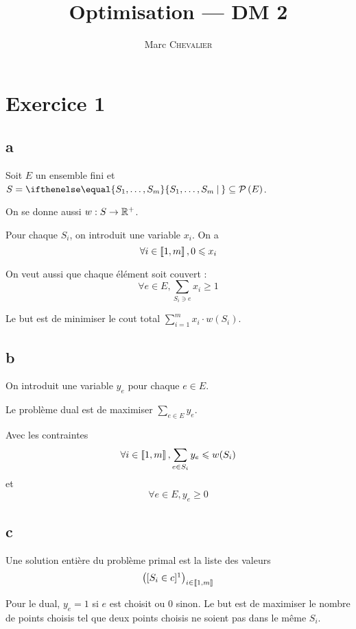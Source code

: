 

\title{Optimisation \---- DM 2}
\author{Marc \textsc{Chevalier}}
\date{}



\maketitle

\section*{Exercice 1}

\subsection*{a}

Soit $E$ un ensemble fini et $S=\set{S_1,\ldots,S_m}{}\subseteq \parties{E}$.

On se donne aussi $w:S\rightarrow \mathbb{R}^+$.

Pour chaque $S_i$, on introduit une variable $x_i$. On a 
\[
    \forall i \in \left\llbracket 1, m \right\rrbracket, 0\leqslant x_i
\]

On veut aussi que chaque élément soit couvert :
\[
    \forall e\in E, \sum\limits_{S_i \ni e} x_i \geqslant 1
\]

Le but est de minimiser le cout total $\sum\limits_{i=1}^m x_i \cdot w(S_i)$.

\subsection*{b}

On introduit une variable $y_e$ pour chaque $e\in E$.

Le problème dual est de maximiser $\sum\limits_{e \in E} y_e$.

Avec les contraintes
\[
    \forall i\in\left\llbracket 1, m \right\rrbracket, \sum\limits_{e\in S_i} y_e \leqslant w(S_i)
\]
et
\[
    \forall e\in E, y_e \geqslant 0
\]

\subsection*{c}

Une solution entière du problème primal est la liste des valeurs
\[
    \big([S_i\in c]\footnotemark\big)_{i\in\entiers{1}{m}}
\]

Pour le dual, $y_e=1$ si $e$ est choisit ou $0$ sinon. Le but est de maximiser le nombre de points choisis tel que deux points choisis ne soient pas dans le même $S_i$.

